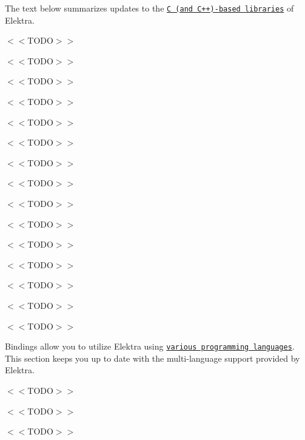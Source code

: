 The text below summarizes updates to the \href{https://www.libelektra.org/libraries/readme}{\tt C (and C++)-\/based libraries} of Elektra.


\begin{DoxyItemize}
\item $<$$<$\+T\+O\+D\+O$>$$>$
\item $<$$<$\+T\+O\+D\+O$>$$>$
\item $<$$<$\+T\+O\+D\+O$>$$>$
\end{DoxyItemize}


\begin{DoxyItemize}
\item $<$$<$\+T\+O\+D\+O$>$$>$
\item $<$$<$\+T\+O\+D\+O$>$$>$
\item $<$$<$\+T\+O\+D\+O$>$$>$
\end{DoxyItemize}


\begin{DoxyItemize}
\item $<$$<$\+T\+O\+D\+O$>$$>$
\item $<$$<$\+T\+O\+D\+O$>$$>$
\item $<$$<$\+T\+O\+D\+O$>$$>$
\end{DoxyItemize}


\begin{DoxyItemize}
\item $<$$<$\+T\+O\+D\+O$>$$>$
\item $<$$<$\+T\+O\+D\+O$>$$>$
\item $<$$<$\+T\+O\+D\+O$>$$>$
\end{DoxyItemize}


\begin{DoxyItemize}
\item $<$$<$\+T\+O\+D\+O$>$$>$
\item $<$$<$\+T\+O\+D\+O$>$$>$
\item $<$$<$\+T\+O\+D\+O$>$$>$
\end{DoxyItemize}

Bindings allow you to utilize Elektra using \href{https://www.libelektra.org/bindings/readme}{\tt various programming languages}. This section keeps you up to date with the multi-\/language support provided by Elektra.


\begin{DoxyItemize}
\item $<$$<$\+T\+O\+D\+O$>$$>$
\item $<$$<$\+T\+O\+D\+O$>$$>$
\item $<$$<$\+T\+O\+D\+O$>$$>$
\end{DoxyItemize}


